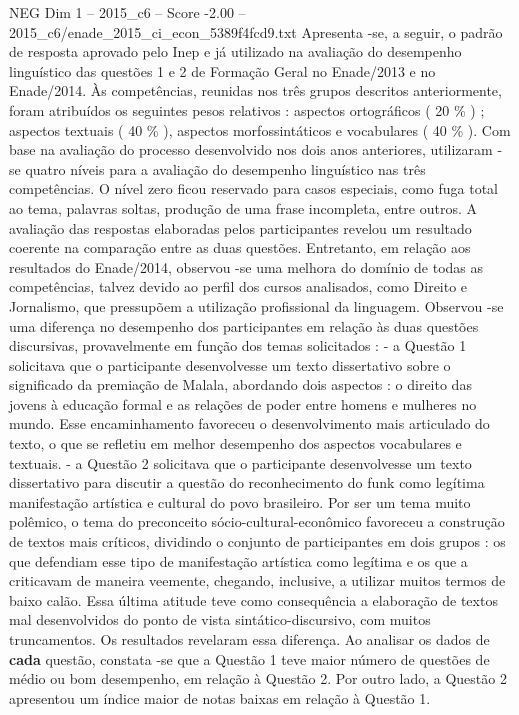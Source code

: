 \begin{textsample}{NEG Dim 1 – 2015\_c6 – Score -2.00 – 2015\_c6/enade\_2015\_ci\_econ\_5389f4fcd9.txt}
Apresenta -se, a seguir, o padrão de resposta aprovado pelo Inep e já utilizado na avaliação do desempenho linguístico das questões 1 e 2 de Formação Geral no Enade/2013 e no Enade/2014.
Às competências, reunidas nos três grupos descritos anteriormente, foram atribuídos os seguintes pesos relativos : aspectos ortográficos ( 20 \% ) ; aspectos textuais ( 40 \% ), aspectos morfossintáticos e vocabulares ( 40 \% ).
Com base na avaliação do processo desenvolvido nos dois anos anteriores, utilizaram -se quatro níveis para a avaliação do desempenho linguístico nas três competências.
O nível zero ficou reservado para casos especiais, como fuga total ao tema, palavras soltas, produção de uma frase incompleta, entre outros.
A avaliação das respostas elaboradas pelos participantes revelou um resultado coerente na comparação entre as duas questões.
Entretanto, em relação aos resultados do Enade/2014, observou -se uma melhora do domínio de todas as competências, talvez devido ao perfil dos cursos analisados, como Direito e Jornalismo, que pressupõem a utilização profissional da linguagem.
Observou -se uma diferença no desempenho dos participantes em relação às duas questões discursivas, provavelmente em função dos temas solicitados : - a Questão 1 solicitava que o participante desenvolvesse um texto dissertativo sobre o significado da premiação de Malala, abordando dois aspectos : o direito das jovens à educação formal e as relações de poder entre homens e mulheres no mundo.
Esse encaminhamento favoreceu o desenvolvimento mais articulado do texto, o que se refletiu em melhor desempenho dos aspectos vocabulares e textuais. - a Questão 2 solicitava que o participante desenvolvesse um texto dissertativo para discutir a questão do reconhecimento do funk como legítima manifestação artística e cultural do povo brasileiro.
Por ser um tema muito polêmico, o tema do preconceito sócio-cultural-econômico favoreceu a construção de textos mais críticos, dividindo o conjunto de participantes em dois grupos : os que defendiam esse tipo de manifestação artística como legítima e os que a criticavam de maneira veemente, chegando, inclusive, a utilizar muitos termos de baixo calão.
Essa última atitude teve como consequência a elaboração de textos mal desenvolvidos do ponto de vista sintático-discursivo, com muitos truncamentos.
Os resultados revelaram essa diferença.
Ao analisar os dados de \textbf{cada} questão, constata -se que a Questão 1 teve maior número de questões de médio ou bom desempenho, em relação à Questão 2.
Por outro lado, a Questão 2 apresentou um índice maior de notas baixas em relação à Questão 1.

\end{textsample}
